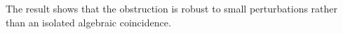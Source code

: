 The result shows that the obstruction is robust to small perturbations rather than an isolated algebraic coincidence.